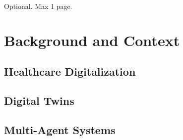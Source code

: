 \documentclass[12pt,a4paper,openright,twoside]{book}
\begin{document}
\begin{acknowledgements} %
Optional. Max 1 page.
\end{acknowledgements}

\tableofcontents   
\listoffigures     %
\lstlistoflistings %

\mainmatter

\label{chap:introduction}
\nocite{2pkt-jelia2021}


\part{Background and Context}

\chapter{Healthcare Digitalization}
\label{chap:back:Healthcare}

\chapter{Digital Twins}
\label{chap:back:DT}

\chapter{Multi-Agent Systems}
\label{chap:back:MAS}
\end{document}

